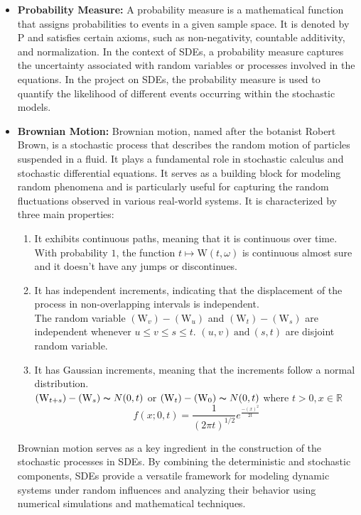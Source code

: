 \documentclass{article}
\newcommand{\W}{\text{W}}
\begin{document}
\begin{itemize}
    \item \textbf{Probability Measure:} A probability measure is a mathematical function that assigns probabilities to events in a given sample space. It is denoted by P and satisfies certain axioms, such as non-negativity, countable additivity, and normalization. In the context of SDEs, a probability measure captures the uncertainty associated with random variables or processes involved in the equations. In the project on SDEs, the probability measure is used to quantify the likelihood of different events occurring within the stochastic models. 
 
    \item \textbf{Brownian Motion:} Brownian motion, named after the botanist Robert Brown, is a stochastic process that describes the random motion of particles suspended in a fluid. It plays a fundamental role in stochastic calculus and stochastic differential equations. It serves as a building block for modeling random phenomena and is particularly useful for capturing the random fluctuations observed in various real-world systems. It is characterized by three main properties:
    \begin{enumerate}
        \item It exhibits continuous paths, meaning that it is continuous over time.\\        With probability $1$, the function $t \mapsto \W(t,\omega)$ is continuous almost sure and it doesn't have any jumps or discontinues.
        \item It has independent increments, indicating that the displacement of the process in non-overlapping intervals is independent.\\        The random variable $(\W_v)-(\W_u)$ and $(\W_t)-(\W_s)$ are independent whenever $u\leq v \leq s \leq t$. $(u,v) \ \text{and} \  (s,t)$ are disjoint random variable.
        \item It has Gaussian increments, meaning that the increments follow a normal distribution.\\        $(\W_{t+s})-(\W_s)  \thicksim N(0,t)$ or  $(\W_{t})-(\W_0)  \thicksim N(0,t)$  where $t > 0, x \in \mathbb{R}$ 
    \[ f(x;0,t) = \frac{1}{(2\pi t)^{1/2}} e^{\frac{-(x)^{2}}{2t}}\]
    \end{enumerate}
   Brownian motion serves as a key ingredient in the construction of the stochastic processes in SDEs. By combining the deterministic and stochastic components, SDEs provide a versatile framework for modeling dynamic systems under random influences and analyzing their behavior using numerical simulations and mathematical techniques.

\end{itemize}
\end{document}
